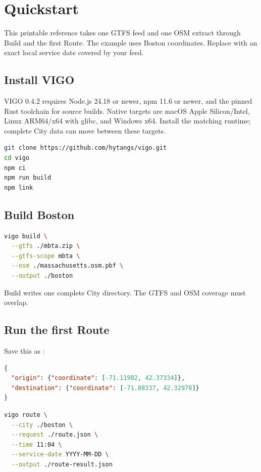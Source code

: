 \documentclass[10pt,letterpaper]{article}
\begin{document}
\guideheader

\section{Quickstart}

This printable reference takes one GTFS feed and one OSM extract through Build and the first Route. The example uses Boston coordinates. Replace  with an exact local service date covered by your feed.

\subsection{Install VIGO}

VIGO 0.4.2 requires Node.js 24.18 or newer, npm 11.6 or newer, and the pinned Rust toolchain for source builds. Native targets are macOS Apple Silicon/Intel, Linux ARM64/x64 with glibc, and Windows x64. Install the matching runtime; complete City data can move between these targets.

\begin{lstlisting}[language=bash]
git clone https://github.com/hytangs/vigo.git
cd vigo
npm ci
npm run build
npm link
\end{lstlisting}

\subsection{Build Boston}

\begin{lstlisting}[language=bash]
vigo build \
  --gtfs ./mbta.zip \
  --gtfs-scope mbta \
  --osm ./massachusetts.osm.pbf \
  --output ./boston
\end{lstlisting}

Build writes one complete City directory. The GTFS and OSM coverage must overlap.

\subsection{Run the first Route}

Save this as \code{route.json}:

\begin{lstlisting}[language=json]
{
  "origin": {"coordinate": [-71.11902, 42.37334]},
  "destination": {"coordinate": [-71.08337, 42.32978]}
}
\end{lstlisting}

\begin{lstlisting}[language=bash]
vigo route \
  --city ./boston \
  --request ./route.json \
  --time 11:04 \
  --service-date YYYY-MM-DD \
  --output ./route-result.json
\end{lstlisting}
\end{document}
